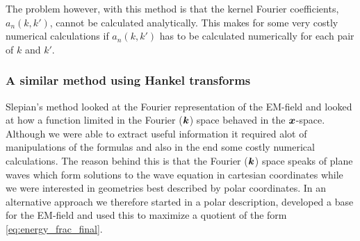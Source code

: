 \documentclass[11pt,a4paper, 
swedish,english %
]{article}
\begin{document}
The problem however, with this method is that the kernel Fourier
coefficients, $a_n(k, k')$, cannot be calculated analytically. This
makes for some very costly numerical calculations if $a_n(k, k')$
has to be calculated numerically for each pair of $k$ and $k'$.


\subsubsection{A similar method using Hankel transforms}
Slepian's method looked at the Fourier representation of the EM-field and looked at how a function limited in the Fourier ($\vb*k$) space behaved in the $\vb*x$-space. Although we were able to extract useful information it required alot of manipulations of the formulas and also in the end some costly numerical calculations. The reason behind this is that the Fourier ($\vb*k$) space speaks of plane waves which form solutions to the wave equation in cartesian coordinates while we were interested in geometries best described by polar coordinates. In an alternative approach we therefore started in a polar description, developed a base for the EM-field and used this to maximize a quotient of the form \eqref{eq:energy_frac_final}.
\end{document}
